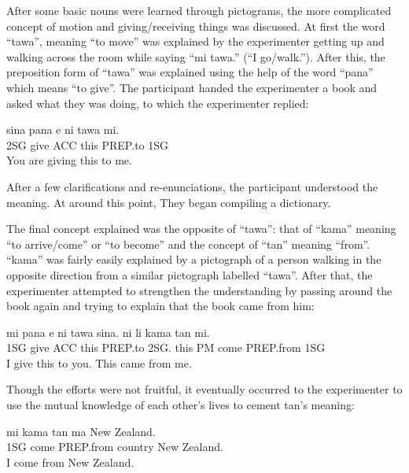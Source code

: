 \documentclass[a4paper,10pt]{article}
\begin{document}
\hfill\break
After some basic nouns were learned through pictograms, the more complicated
concept of motion and giving/receiving things was discussed. At first the
word ``tawa'', meaning ``to move'' was explained by the experimenter getting
up and walking across the room while saying ``mi tawa.'' (``I go/walk.'').
After this, the preposition form of ``tawa'' was explained using the help
of the word ``pana'' which means ``to give''. The participant handed
the experimenter a book and asked what they was doing, to which the experimenter
replied:

\begin{exe}
 \ex
 \gll sina pana e ni tawa mi. \\
 2SG give ACC this PREP.to 1SG \\
 \glt You are giving this to me.
\end{exe}

After a few clarifications and re-enunciations, the participant understood
the meaning. At around this point, They began compiling a  dictionary.

The final concept explained
was the opposite of ``tawa'': that of ``kama'' meaning ``to arrive/come'' or ``to become''
and the concept of ``tan'' meaning ``from''. ``kama'' was fairly easily
explained by a pictograph of a person walking in the opposite direction
from a similar pictograph labelled ``tawa''. After that, the experimenter
attempted to strengthen the understanding by passing around the book again
and trying to explain that the book came from him:

\begin{exe}
 \ex
 \gll mi pana e ni tawa sina. ni li kama tan mi. \\
 1SG give ACC this PREP.to 2SG. this PM come PREP.from 1SG\\
 \glt I give this to you. This came from me.
\end{exe}

Though the efforts were not fruitful, it eventually occurred to the experimenter
to use the mutual knowledge of each other's lives to cement tan's meaning:

\begin{exe}
 \ex
 \gll mi kama tan ma New Zealand\footnotemark. \\
 1SG come PREP.from country New Zealand.\\
 \glt I come from New Zealand.
\end{exe}
\end{document}
